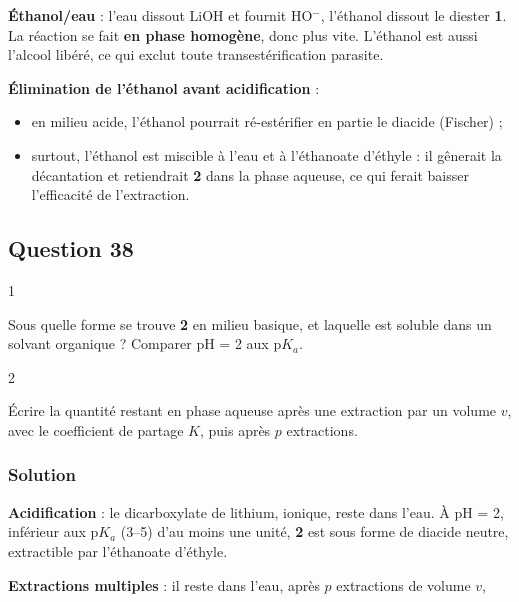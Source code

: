 \documentclass[11pt,a4paper]{article}
\providecommand{\tightlist}{\setlength{\itemsep}{0pt}\setlength{\parskip}{0pt}}
\begin{document}
\textbf{Éthanol/eau} : l'eau dissout LiOH et fournit HO\(^-\), l'éthanol dissout le diester \textbf{1}. La réaction se fait \textbf{en phase homogène}, donc plus vite. L'éthanol est aussi l'alcool libéré, ce qui exclut toute transestérification parasite.

\textbf{Élimination de l'éthanol avant acidification} :

\begin{itemize}
\tightlist
\item
  en milieu acide, l'éthanol pourrait ré-estérifier en partie le diacide (Fischer) ;
\item
  surtout, l'éthanol est miscible à l'eau et à l'éthanoate d'éthyle : il gênerait la décantation et retiendrait \textbf{2} dans la phase aqueuse, ce qui ferait baisser l'efficacité de l'extraction.
\end{itemize}

\hypertarget{question-38}{%
\subsection{Question 38}\label{question-38}}

\begin{indication}{1}

Sous quelle forme se trouve \textbf{2} en milieu basique, et laquelle est soluble dans un solvant organique ? Comparer pH = 2 aux p\(K_a\).

\end{indication}

\begin{indication}{2}

Écrire la quantité restant en phase aqueuse après une extraction par un volume \(v\), avec le coefficient de partage \(K\), puis après \(p\) extractions.

\end{indication}

\hypertarget{solution-37}{%
\subsubsection{Solution}\label{solution-37}}

\textbf{Acidification} : le dicarboxylate de lithium, ionique, reste dans l'eau. À pH = 2, inférieur aux p\(K_a\) (3--5) d'au moins une unité, \textbf{2} est sous forme de diacide neutre, extractible par l'éthanoate d'éthyle.

\textbf{Extractions multiples} : il reste dans l'eau, après \(p\) extractions de volume \(v\),
\end{document}
